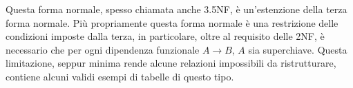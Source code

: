 Questa forma normale, spesso chiamata anche 3.5NF, è un'estenzione della terza forma normale. Più propriamente questa forma normale è una restrizione delle condizioni imposte dalla terza, in particolare, oltre al requisito delle 2NF, è necessario che per ogni dipendenza funzionale $A \rightarrow B$, $A$ sia superchiave. Questa limitazione, seppur minima rende alcune relazioni impossibili da ristrutturare, \cite{wiki:bcnf} contiene alcuni validi esempi di tabelle di questo tipo.
